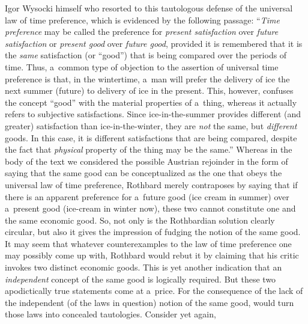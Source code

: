 \begin{artengenv}{Igor Wysocki}
{ himself who resorted to this tautologous defense of the universal law of time preference, which is evidenced by the following passage: ``\textit{Time preference} may be called the preference for \textit{present satisfaction} over \textit{future satisfaction} or \textit{present good} over \textit{future good}, provided it is remembered that it is the \textit{same} satisfaction (or ``good'') that is being compared over the periods of time. Thus, a~common type of objection to the assertion of universal time preference is that, in the wintertime, a~man will prefer the delivery of ice the next summer (future) to delivery of ice in the present. This, however, confuses the concept ``good'' with the material properties of a~thing, whereas it actually refers to subjective satisfactions. Since ice-in-the-summer provides different (and greater) satisfaction than ice-in-the-winter, they are \textit{not} the same, but \textit{different} goods. In this case, it is different satisfactions that are being compared, despite the fact that \textit{physical} property of the thing may be the same.'' Whereas in the body of the text we considered the possible Austrian rejoinder in the form of saying that the same good can be conceptualized as the one that obeys the universal law of time preference, Rothbard merely contraposes by saying that if there is an apparent preference for a~future good (ice cream in summer) over a~present good (ice-cream in winter now), these two cannot constitute one and the same economic good. So, not only is the Rothbardian solution clearly circular, but also it gives the impression of fudging the notion of the same good. It may seem that whatever counterexamples to the law of time preference one may possibly come up with, Rothbard would rebut it by claiming that his critic invokes two distinct economic goods. This is yet another indication that an \textit{independent} concept of the same good is logically required.} But these two apodictically true statements come at a~price. For the consequence of the lack of the independent (of the laws in question) notion of the same good, would turn those laws into concealed tautologies. Consider yet again,


\end{artengenv}
